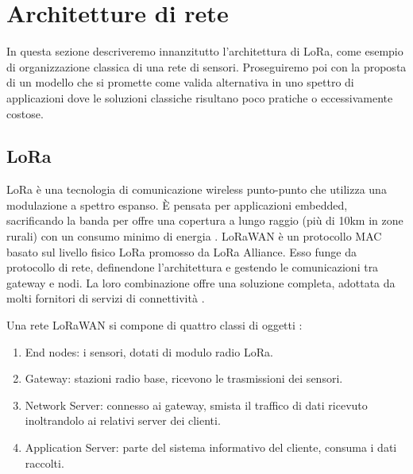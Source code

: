 \documentclass[a4paper,12pt]{article}
\theoremstyle{definition}
\begin{document}

\section{Architetture di rete}

In questa sezione descriveremo innanzitutto l'architettura di LoRa, come esempio di organizzazione classica di una rete di sensori. Proseguiremo poi con la proposta di un modello che si promette come valida alternativa in uno spettro di applicazioni dove le soluzioni classiche risultano poco pratiche o eccessivamente costose.

\subsection{LoRa}

LoRa è una tecnologia di comunicazione wireless punto-punto che utilizza una modulazione a spettro espanso. È pensata per applicazioni embedded, sacrificando la banda per offre una copertura a lungo raggio (più di 10km in zone rurali) con un consumo minimo di energia \cite{loraperf}. LoRaWAN è un protocollo MAC basato sul livello fisico LoRa promosso da LoRa Alliance. Esso funge da protocollo di rete, definendone l'architettura e gestendo le comunicazioni tra gateway e nodi. La loro combinazione offre una soluzione completa, adottata da molti fornitori di servizi di connettività \cite{netprov}.

Una rete LoRaWAN si compone di quattro classi di oggetti \cite{loraspec}:

\begin{enumerate}
\item End nodes: i sensori, dotati di modulo radio LoRa.
\item Gateway: stazioni radio base, ricevono le trasmissioni dei sensori.
\item Network Server: connesso ai gateway, smista il traffico di dati ricevuto inoltrandolo ai relativi server dei clienti.
\item Application Server: parte del sistema informativo del cliente, consuma i dati raccolti.
\end{enumerate}
\end{document}
